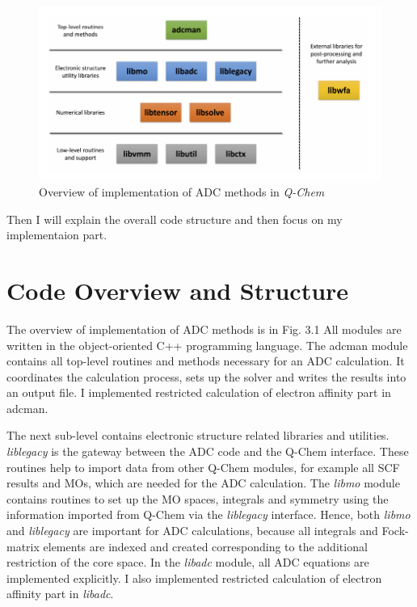 \documentclass[bachelor, english]{ustcthesis}
\begin{document}
\begin{figure}[h]
	\centering
	\includegraphics[width=\textwidth]{./figures/adcman.png}
	\caption{Overview of implementation of ADC methods in \emph{Q-Chem}}
\end{figure}

Then I will explain the overall code structure and then focus on my implementaion part.

\section{Code Overview and Structure}
The overview of implementation of ADC methods is in Fig. 3.1
All modules are written in the object-oriented C++ programming language. 
The adcman module contains all top-level routines and methods necessary for an ADC calculation. 
It coordinates the calculation process, sets up the solver and writes the results into an output file.
I implemented restricted calculation of electron affinity part in adcman.

The next sub-level contains electronic structure related libraries and utilities.
\emph{liblegacy} is the gateway between the ADC code and the Q-Chem interface.
These routines help to import data from other Q-Chem modules, for example all SCF results and MOs, which are needed for the ADC calculation.
The \emph{libmo} module contains routines to set up the MO spaces, integrals and symmetry using the information imported from Q-Chem via the \emph{liblegacy} interface.
Hence, both \emph{libmo} and \emph{liblegacy} are important for ADC calculations, because all integrals and Fock-matrix elements are indexed and created corresponding to the additional restriction of the core space.
In the \emph{libadc} module, all ADC equations are implemented explicitly.
I also implemented restricted calculation of electron affinity part in \emph{libadc}.
\end{document}
